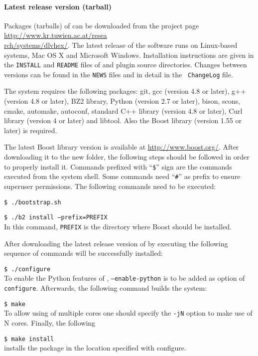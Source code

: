 \documentclass[a4paper, titlepage]{article}
\newcommand\leftaligned[1]{\par \smallskip #1 \smallskip\\}
\begin{document}
\paragraph{Latest release version (tarball)}
\label{sec:steps}
Packages (tarballs) of \dlvhex{} can be downloaded from the 
project page \url{http://www.kr.tuwien.ac.at/resea} \\ 
\url{rch/systems/dlvhex/}. The latest release of the 
software runs on Linux-based systems, Mac OS X and 
Microsoft Windows. Installation instructions are given in 
the {\tt INSTALL} and {\tt README} files of \dlvhex{} 
and plugin source directories. Changes between versions can 
be found in the {\tt NEWS} files and in detail in the {\tt 
ChangeLog} file. 

The system requires the following packages: git, gcc 
(version 4.8 or later), g++ (version 4.8 or later), BZ2 
library, Python (version 2.7 or later), bison, scons, 
cmake, automake, autoconf, standard C++ library (version 
4.8 or later), Curl library (version 4 or later) and 
libtool. Also the Boost library (version 1.55 or later) is 
required. 

The latest Boost library version is available at 
\url{http://www.boost.org/}. After downloading it to the 
new folder, the following steps should be followed in order 
to properly install it. Commands prefixed with ``\texttt{\$}'' sign are the commands executed from the system shell. Some commands need ``\texttt{\#}'' as prefix to ensure superuser permissions. The following 
commands need to be executed:
%
\par \smallskip \texttt{\$ \thinspace ./bootstrap.sh} \smallskip
%
\leftaligned{\texttt{\$ \thinspace ./b2 install --prefix=PREFIX}}
%
In this 
command, \texttt{PREFIX} is the directory where Boost should 
be installed. 

After downloading the latest release version of \dlvhex{} by 
executing the following sequence of commands \dlvhex{} will 
be successfully installed:
%
\leftaligned{\texttt{\$ \thinspace ./configure}} 
%
To enable the Python 
features of \dlvhex{}, \texttt{--enable-python} is to be 
added as option of \texttt{configure}. Afterwards, the 
following command builds the system:
%
\leftaligned{\texttt{\$ \thinspace make}} 
%
To allow using of multiple 
cores one should specify the \texttt{-jN} option to make 
use of N cores. Finally, the following
%
\leftaligned{\texttt{\$ \thinspace make install}}
%
installs the package 
in the location specified with configure.  
   
\end{document}
